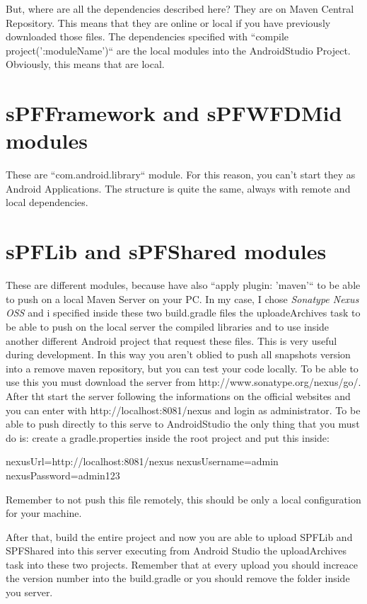 But, where are all the dependencies described here? They are on Maven Central Repository. This means that they are online or local if you have previously downloaded those files.
The dependencies specified with ``compile project(':moduleName')`` are the local modules into the AndroidStudio Project. Obviously, this means that are local.

\section*{sPFFramework and sPFWFDMid modules}
These are ``com.android.library`` module. For this reason, you can't start they as Android Applications.
The structure is quite the same, always with remote and local dependencies.

\section*{sPFLib and sPFShared modules}
These are different modules, because have also ``apply plugin: 'maven'`` to be able to push on a local Maven Server on your PC.
In my case, I chose \emph{Sonatype Nexus OSS} and i specified inside these two build.gradle files the uploadeArchives task to be able to push on the local server the compiled libraries and to use inside another different Android project that request these files.
This is very useful during development. In this way you aren't oblied to push all snapshots version into a remove maven repository, but you can test your code locally.
To be able to use this you must download the server from http://www.sonatype.org/nexus/go/. 
After tht start the server following the informations on the official websites and you can enter with http://localhost:8081/nexus and login as administrator.
To be able to push directly to this serve to AndroidStudio the only thing that you must do is:
create a gradle.properties inside the root project and put this inside:

nexusUrl=http://localhost:8081/nexus
nexusUsername=admin
nexusPassword=admin123

Remember to not push this file remotely, this should be only a local configuration for your machine.

After that, build the entire project and now you are able to upload SPFLib and SPFShared into this server executing from Android Studio the uploadArchives task into these two projects. Remember that at every upload you should increace the version number into the build.gradle or you should remove the folder inside you server.

